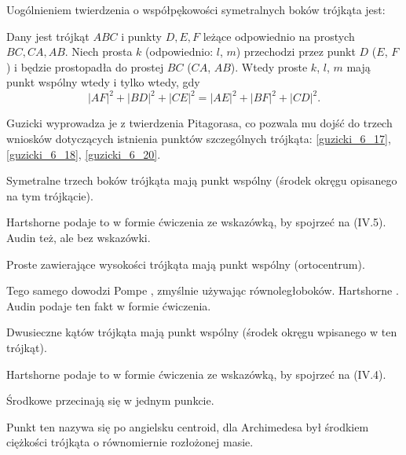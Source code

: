 %

Uogólnieniem twierdzenia o współpękowości symetralnych boków trójkąta jest:

\begin{proposition}
\label{guzicki_6_13}%
	Dany jest trójkąt $ABC$ i punkty $D, E, F$ leżące odpowiednio na prostych $BC, CA, AB$.
	Niech prosta $k$ (odpowiednio: $l$, $m$) przechodzi przez punkt $D$ ($E$, $F$) i będzie prostopadła do prostej $BC$ ($CA$, $AB$).
	Wtedy proste $k$, $l$, $m$ mają punkt wspólny wtedy i tylko wtedy, gdy
	\begin{equation}
		|AF|^2 + |BD|^2 + |CE|^2 = |AE|^2 + |BF|^2 + |CD|^2.
	\end{equation}
\end{proposition}

Guzicki \cite[s. 176]{guzicki_2021} wyprowadza je z twierdzenia Pitagorasa, co pozwala mu dojść do trzech wniosków dotyczących istnienia punktów szczególnych trójkąta: \ref{guzicki_6_17}, \ref{guzicki_6_18}, \ref{guzicki_6_20}.

\begin{corollary}
\label{guzicki_6_17}%
    Symetralne trzech boków trójkąta mają punkt wspólny (środek okręgu opisanego na tym trójkącie).
\end{corollary}

Hartshorne \cite[s. 16]{hartshorne2000} podaje to w formie ćwiczenia ze wskazówką, by spojrzeć na (IV.5).
Audin \cite[s. 61]{audin_2003} też, ale bez wskazówki.

\begin{corollary}
\label{guzicki_6_18}%
    Proste zawierające wysokości trójkąta mają punkt wspólny (ortocentrum).
%
\end{corollary}

Tego samego dowodzi Pompe \cite[s. 38]{pompe_2022}, zmyślnie używając równoległoboków.
Hartshorne \cite[s. 54]{hartshorne2000}.
Audin \cite[s. 61]{audin_2003} podaje ten fakt w formie ćwiczenia.

\begin{corollary} %
\label{guzicki_6_20}%
    Dwusieczne kątów trójkąta mają punkt wspólny (środek okręgu wpisanego w ten trójkąt).
\end{corollary}

Hartshorne \cite[s. 16]{hartshorne2000} podaje to w formie ćwiczenia ze wskazówką, by spojrzeć na (IV.4).

Środkowe przecinają się w jednym punkcie. %

Punkt ten nazywa się po angielsku centroid, dla Archimedesa był środkiem ciężkości trójkąta o równomiernie rozłożonej masie.


%